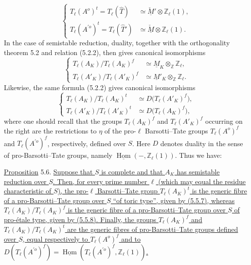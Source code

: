 \begin{equation}\tag{5.5.7}
 \left\{
 \begin{aligned}
  T_\ell(A^o)^t=T_\ell(\widehat T)
   &\simeq \check{\underline M}'\otimes\mathbb Z_\ell(1),\\[1ex]
  T_\ell(A^{\prime o})^t=T_\ell(\widehat T')
   &\simeq \check{\underline M}\otimes\mathbb Z_\ell(1).
 \end{aligned}
 \right.
\end{equation}
In the case of semistable reduction, duality, together with the
orthogonality theorem 5.2 and relation (5.2.2), then gives canonical
isomorphisms
\begin{equation}\tag{5.5.8}
 \left\{
 \begin{aligned}
  T_\ell(A_K)/T_\ell(A_K)^f
   &\simeq \underline M_K\otimes_{\mathbb Z}\mathbb Z_\ell,\\[1ex]
  T_\ell(A'_K)/T_\ell(A'_K)^f
   &\simeq \underline M'_K\otimes_{\mathbb Z}\mathbb Z_\ell.
 \end{aligned}
 \right.
\end{equation}
Likewise, the same formula (5.2.2) gives canonical isomorphisms
\begin{equation}\tag{5.5.9}
 \left\{
 \begin{aligned}
  T_\ell(A_K)/T_\ell(A_K)^t
   &\simeq D\bigl(T_\ell(A'_K)^f\bigr),\\[1ex]
  T_\ell(A'_K)/T_\ell(A'_K)^t
   &\simeq D\bigl(T_\ell(A_K)^f\bigr),
 \end{aligned}
 \right.
\end{equation}
where one should recall that the groups $T_\ell(A_K)^f$ and
$T_\ell(A'_K)^f$ occurring on the right are the restrictions to
$\eta$ of the pro-$\ell$ Barsotti--Tate groups $T_\ell(A^o)^f$ and
$T_\ell(A^{\prime o})^f$, respectively, defined over $S$. Here $D$
denotes duality in the sense of pro-Barsotti--Tate groups, namely
$\underline{\operatorname{Hom}}(-,\mathbb Z_\ell(1))$. Thus we have:

\medskip
\noindent
\underline{Proposition} 5.6. \underline{Suppose that $S$ is complete
and that $A_K$ has semistable reduction over $S$. Then, for every
prime number $\ell$ (which may equal the residue characteristic of
$S$), the pro-$\ell$ Barsotti--Tate group $T_\ell(A_K)^t$ is the
generic fibre of a pro-Barsotti--Tate group over $S$ ``of toric
type'', given by (5.5.7), whereas
$T_\ell(A_K)/T_\ell(A_K)^f$ is the generic fibre of a
pro-Barsotti--Tate group over $S$ of pro-\'{e}tale type, given by
(5.5.8). Finally, the groups $T_\ell(A_K)^f$ and
$T_\ell(A_K)/T_\ell(A_K)^t$ are the generic fibres of
pro-Barsotti--Tate groups defined over $S$, equal respectively to
$T_\ell(A^o)^f$ and to
$D(T_\ell(A^{\prime o})^f)=
\underline{\operatorname{Hom}}(T_\ell(A^{\prime o})^f,
\mathbb Z_\ell(1))$.}

